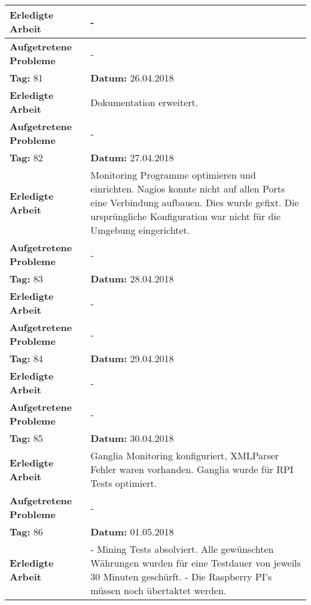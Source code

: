 \begin{longtable}{|p{5cm}|p{5cm}p{6cm}|}
\textbf{Erledigte Arbeit} & \multicolumn{2}{p{11cm}|}{-} \\ \hline
\textbf{Aufgetretene Probleme} & \multicolumn{2}{p{11cm}|}{-} \\ \hline
\rowcolor{heading}\textbf{Tag:} 81 & \textbf{Datum:} 26.04.2018 & \\ \hline
\textbf{Erledigte Arbeit} & \multicolumn{2}{p{11cm}|}{Dokumentation erweitert.} \\ \hline
\textbf{Aufgetretene Probleme} & \multicolumn{2}{p{11cm}|}{-} \\ \hline
\rowcolor{heading}\textbf{Tag:} 82 & \textbf{Datum:} 27.04.2018 & \\ \hline
\textbf{Erledigte Arbeit} & \multicolumn{2}{p{11cm}|}{Monitoring Programme optimieren und einrichten. Nagios konnte nicht auf allen Ports eine Verbindung aufbauen. Dies wurde gefixt. Die ursprüngliche Konfiguration war nicht für die Umgebung eingerichtet.} \\ \hline
\textbf{Aufgetretene Probleme} & \multicolumn{2}{p{11cm}|}{-} \\ \hline
\rowcolor{heading}\textbf{Tag:} 83 & \textbf{Datum:} 28.04.2018 & \\ \hline
\textbf{Erledigte Arbeit} & \multicolumn{2}{p{11cm}|}{-} \\ \hline
\textbf{Aufgetretene Probleme} & \multicolumn{2}{p{11cm}|}{-} \\ \hline
\rowcolor{heading}\textbf{Tag:} 84 & \textbf{Datum:} 29.04.2018 & \\ \hline
\textbf{Erledigte Arbeit} & \multicolumn{2}{p{11cm}|}{-} \\ \hline
\textbf{Aufgetretene Probleme} & \multicolumn{2}{p{11cm}|}{-} \\ \hline
\rowcolor{heading}\textbf{Tag:} 85 & \textbf{Datum:} 30.04.2018 & \\ \hline
\textbf{Erledigte Arbeit} & \multicolumn{2}{p{11cm}|}{Ganglia Monitoring konfiguriert, XMLParser Fehler waren vorhanden. Ganglia wurde für RPI Tests optimiert.} \\ \hline
\textbf{Aufgetretene Probleme} & \multicolumn{2}{p{11cm}|}{-} \\ \hline
\rowcolor{heading}\textbf{Tag:} 86 & \textbf{Datum:} 01.05.2018 & \\ \hline
\textbf{Erledigte Arbeit} & \multicolumn{2}{p{11cm}|}{- Mining Tests absolviert. Alle gewünschten Währungen wurden für eine Testdauer von jeweils 30 Minuten geschürft. \newline
- Die Raspberry PI's müssen noch übertaktet werden.} \\ \hline

\end{longtable}
